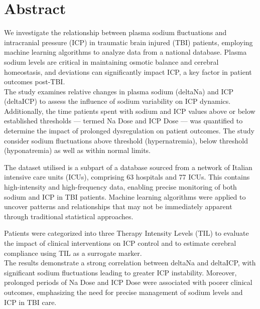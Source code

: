 \chapter*{Abstract}

We investigate the relationship between plasma sodium fluctuations and intracranial pressure (ICP) in traumatic brain injured (TBI) patients, employing machine learning algorithms to analyze data from a national database. Plasma sodium levels are critical in maintaining osmotic balance and cerebral homeostasis, and deviations can significantly impact ICP, a key factor in patient outcomes post-TBI.\\

The study examines relative changes in plasma sodium (deltaNa) and ICP (deltaICP) to assess the influence of sodium variability on ICP dynamics. Additionally, the time patients spent with sodium and ICP values above or below established thresholds — termed Na Dose and ICP Dose — was quantified to determine the impact of prolonged dysregulation on patient outcomes. The study consider sodium fluctuations above threshold (hypernatremia), below threshold (hyponatremia) as well as within normal limits.

The dataset utilised is a subpart of a database sourced from a network of Italian intensive care units (ICUs), comprising 63 hospitals and 77 ICUs. This contains high-intensity and high-frequency data, enabling precise monitoring of both sodium and ICP in TBI patients. Machine learning algorithms were applied to uncover patterns and relationships that may not be immediately apparent through traditional statistical approaches.

Patients were categorized into three Therapy Intensity Levels (TIL) to evaluate the impact of clinical interventions on ICP control and to estimate cerebral compliance using TIL as a surrogate marker. \\

The results demonstrate a strong correlation between deltaNa and deltaICP, with significant sodium fluctuations leading to greater ICP instability. Moreover, prolonged periods of  Na Dose and ICP Dose were associated with poorer clinical outcomes, emphasizing the need for precise management of sodium levels and ICP in TBI care.